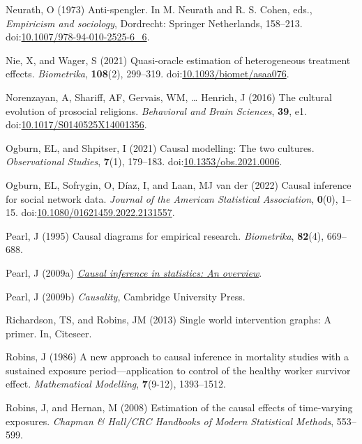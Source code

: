 \documentclass[
  singlecolumn]{article}
\newlength{\cslhangindent}
\newenvironment{CSLReferences}[2] %
 {\begin{list}{}{%
  \setlength{\itemindent}{0pt}
  \setlength{\leftmargin}{0pt}
  \setlength{\parsep}{0pt}
  \ifodd #1
   \setlength{\leftmargin}{\cslhangindent}
   \setlength{\itemindent}{-1\cslhangindent}
  \fi
  \setlength{\itemsep}{#2\baselineskip}}}
 {\end{list}}
\begin{document}
\begin{CSLReferences}{1}{0}
Neurath, O (1973) Anti-spengler. In M. Neurath and R. S. Cohen, eds.,
\emph{Empiricism and sociology}, Dordrecht: Springer Netherlands,
158--213.
doi:\href{https://doi.org/10.1007/978-94-010-2525-6_6}{10.1007/978-94-010-2525-6\_6}.

Nie, X, and Wager, S (2021) Quasi-oracle estimation of heterogeneous
treatment effects. \emph{Biometrika}, \textbf{108}(2), 299--319.
doi:\href{https://doi.org/10.1093/biomet/asaa076}{10.1093/biomet/asaa076}.

Norenzayan, A, Shariff, AF, Gervais, WM, \ldots{} Henrich, J (2016) The
cultural evolution of prosocial religions. \emph{Behavioral and Brain
Sciences}, \textbf{39}, e1.
doi:\href{https://doi.org/10.1017/S0140525X14001356}{10.1017/S0140525X14001356}.

Ogburn, EL, and Shpitser, I (2021) Causal modelling: The two cultures.
\emph{Observational Studies}, \textbf{7}(1), 179--183.
doi:\href{https://doi.org/10.1353/obs.2021.0006}{10.1353/obs.2021.0006}.

Ogburn, EL, Sofrygin, O, Díaz, I, and Laan, MJ van der (2022) Causal
inference for social network data. \emph{Journal of the American
Statistical Association}, \textbf{0}(0), 1--15.
doi:\href{https://doi.org/10.1080/01621459.2022.2131557}{10.1080/01621459.2022.2131557}.

Pearl, J (1995) Causal diagrams for empirical research.
\emph{Biometrika}, \textbf{82}(4), 669--688.

Pearl, J (2009a) \emph{\href{https://doi.org/10.1214/09-SS057}{Causal
inference in statistics: An overview}}.

Pearl, J (2009b) \emph{Causality}, Cambridge University Press.

Richardson, TS, and Robins, JM (2013) Single world intervention graphs:
A primer. In, Citeseer.

Robins, J (1986) A new approach to causal inference in mortality studies
with a sustained exposure period---application to control of the healthy
worker survivor effect. \emph{Mathematical Modelling}, \textbf{7}(9-12),
1393--1512.

Robins, J, and Hernan, M (2008) Estimation of the causal effects of
time-varying exposures. \emph{Chapman \& Hall/CRC Handbooks of Modern
Statistical Methods}, 553--599.


\end{CSLReferences}
\end{document}
